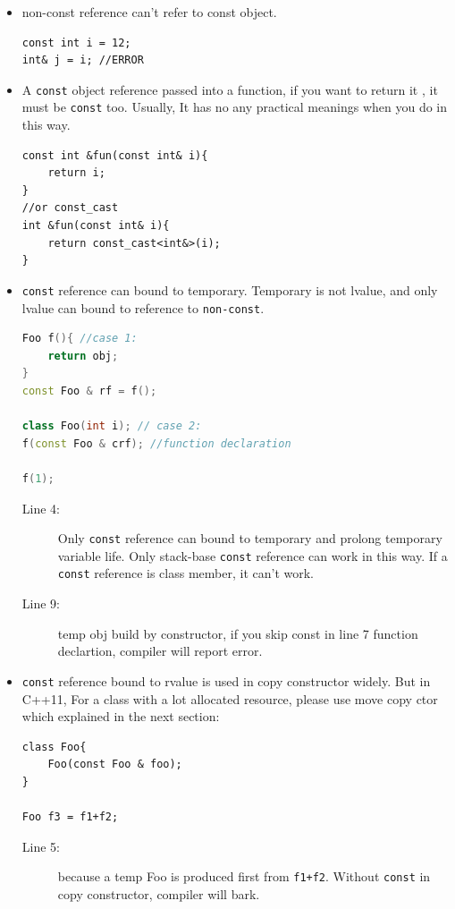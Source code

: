 \documentclass[a4paper,11pt,twoside]{book}
\begin{document}
\begin{itemize}
\item non-const reference can't refer to const object.
\begin{lstlisting}[numbers=none]
const int i = 12;
int& j = i; //ERROR
\end{lstlisting}

\item A \texttt{const} object reference passed into a function, if you want to return it , it must be \texttt{const} too. Usually, It has no any practical meanings when you do in this way. 
\begin{lstlisting}[numbers=none]
const int &fun(const int& i){ 
	return i;
}
//or const_cast 
int &fun(const int& i){ 
	return const_cast<int&>(i);
}
\end{lstlisting}

\item  \texttt{const} reference can bound to temporary. Temporary is not lvalue, and only lvalue can bound to reference to \texttt{non-const}.   
\begin{lstlisting}[frame=single, language=c++]
Foo f(){ //case 1:
	return obj;
}
const Foo & rf = f();

class Foo(int i); // case 2:
f(const Foo & crf); //function declaration

f(1);
\end{lstlisting}
\begin{description}
	\item[Line 4:] Only \texttt{const} reference can bound to temporary and prolong temporary variable life. Only stack-base \texttt{const} reference can work in this way. If a \texttt{const} reference is class member, it can't work. 
	
	\item[Line 9:] temp obj build by constructor, if you skip const in line 7 function declartion, compiler will report error.
\end{description}

	\item \texttt{const} reference bound to rvalue is used in copy constructor widely. But in C++11, For a class with a lot allocated resource, please use move copy ctor which explained in the next section:

\begin{lstlisting}[numbers=none]
class Foo{
	Foo(const Foo & foo);
}

Foo f3 = f1+f2;
\end{lstlisting}
\begin{description}
	\item[Line 5:] because a temp Foo is produced first from \texttt{f1+f2}. Without \texttt{const} in copy constructor, compiler will bark.
\end{description}

\end{itemize}
\end{document}

